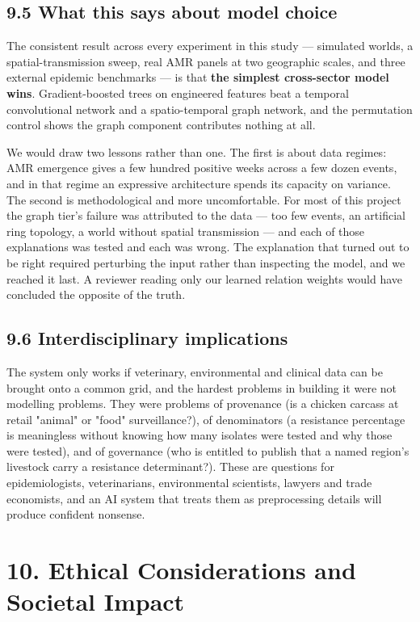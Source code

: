 \documentclass[11pt,a4paper]{article}
\begin{document}
\subsection*{9.5 What this says about model choice}

The consistent result across every experiment in this study — simulated worlds, a spatial-transmission sweep, real AMR panels at two geographic scales, and three external epidemic benchmarks — is that \textbf{the simplest cross-sector model wins}. Gradient-boosted trees on engineered features beat a temporal convolutional network and a spatio-temporal graph network, and the permutation control shows the graph component contributes nothing at all.

We would draw two lessons rather than one. The first is about data regimes: AMR emergence gives a few hundred positive weeks across a few dozen events, and in that regime an expressive architecture spends its capacity on variance. The second is methodological and more uncomfortable. For most of this project the graph tier's failure was attributed to the data — too few events, an artificial ring topology, a world without spatial transmission — and each of those explanations was tested and each was wrong. The explanation that turned out to be right required perturbing the input rather than inspecting the model, and we reached it last. A reviewer reading only our learned relation weights would have concluded the opposite of the truth.

\subsection*{9.6 Interdisciplinary implications}

The system only works if veterinary, environmental and clinical data can be brought onto a common grid, and the hardest problems in building it were not modelling problems. They were problems of provenance (is a chicken carcass at retail "animal" or "food" surveillance?), of denominators (a resistance percentage is meaningless without knowing how many isolates were tested and why those were tested), and of governance (who is entitled to publish that a named region's livestock carry a resistance determinant?). These are questions for epidemiologists, veterinarians, environmental scientists, lawyers and trade economists, and an AI system that treats them as preprocessing details will produce confident nonsense.

\section*{10. Ethical Considerations and Societal Impact}
\end{document}
